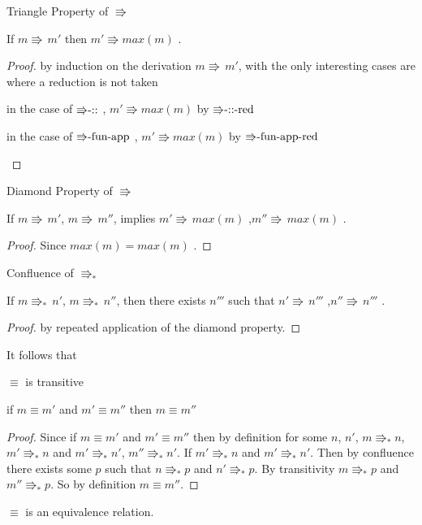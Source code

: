 \begin{lem}
Triangle Property of $\Rrightarrow$

If $m\Rrightarrow\,m'$ then $m'\Rrightarrow max\left(m\right)$ .
\end{lem}

\begin{proof}
by induction on the derivation $m\Rrightarrow\,m'$, with the only interesting cases are where a reduction is not taken
\begin{casenv}
\item in the case of $\textrm{\ensuremath{\Rrightarrow}-::}$ , $m'\Rrightarrow max\left(m\right)$
by $\textrm{\ensuremath{\Rrightarrow}-::-red}$
\item in the case of $\textrm{\ensuremath{\Rrightarrow}-fun-app}$ , $m'\Rrightarrow max\left(m\right)$
by $\textrm{\ensuremath{\Rrightarrow}-fun-app-red}$ 
\end{casenv}
\end{proof}
\begin{lem}
Diamond Property of $\Rrightarrow$

If $m\Rrightarrow\,m'$, $m\Rrightarrow\,m''$, implies $m'\Rrightarrow\,max\left(m\right)$
,$m''\Rrightarrow\,max\left(m\right)$ . 
\end{lem}

\begin{proof}
Since $max\left(m\right)=max\left(m\right)$ . 
\end{proof}
\begin{thm}
Confluence of $\Rrightarrow_{\ast}$ 

If $m\Rrightarrow_{\ast}\,n'$, $m\Rrightarrow_{\ast}\,n''$, then
there exists $n'''$ such that $n'\Rrightarrow\,n'''$ ,$n''\Rrightarrow\,n'''$
.
\end{thm}

\begin{proof}
by repeated application of the diamond property.
\end{proof}
It follows that
\begin{thm}
$\equiv$ is transitive

if $m\equiv m'$ and $m'\equiv m''$ then $m\equiv m''$
\end{thm}

\begin{proof}
Since if $m\equiv m'$ and $m'\equiv m''$ then by definition for some $n$, $n'$, $m\Rrightarrow_{\ast}n$, $m'\Rrightarrow_{\ast}n$ and $m'\Rrightarrow_{\ast}n'$, $m''\Rrightarrow_{\ast}n'$. If $m'\Rrightarrow_{\ast}n$ and $m'\Rrightarrow_{\ast}n'$.
Then by confluence there exists some $p$ such that $n\Rrightarrow_{\ast}p$ and $n'\Rrightarrow_{\ast}p$.
By transitivity $m\Rrightarrow_{\ast}p$ and $m''\Rrightarrow_{\ast}p$.
So by definition $m\equiv m''$.
\end{proof}
\begin{fact}
$\equiv$ is an equivalence relation.
\end{fact}


